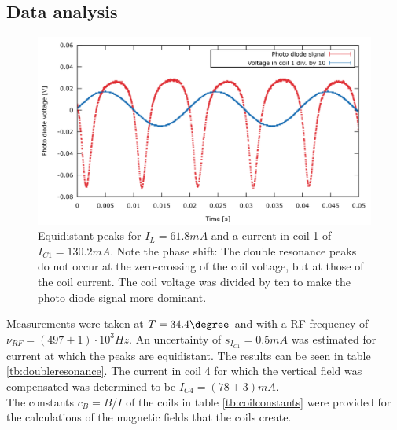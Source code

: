 \subsection{Data analysis}
\begin{figure}
\centering
\includegraphics[width=1.0\linewidth]{graphics/equaldistance}
\caption[Double resonance peaks]{Equidistant peaks for $I_L=\unit{61.8}{mA}$ and a current in coil 1 of $I_{C1}=\unit{130.2}{mA}$. Note the phase shift: The double resonance peaks do not occur at the zero-crossing of the coil voltage, but at those of the coil current. The coil voltage was divided by ten to make the photo diode signal more dominant.}
\label{fig:equaldistance}
\end{figure}
Measurements were taken at $T=\unit{34.4}{\degree}$ and with a RF frequency of $\nu_{RF}=\unit{(497\pm1)\cdot10^3}{Hz}$. An uncertainty of $s_{I_{C1}}=\unit{0.5}{mA}$ was estimated for current at which the peaks are equidistant. The results can be seen in table \ref{tb:doubleresonance}. The current in coil 4 for which the vertical field was compensated was determined to be $I_{C4}=\unit{(78\pm3)}{mA}$.\\
The constants $c_B=B/I$ of the coils in table \ref{tb:coilconstants} were provided for the calculations of the magnetic fields that the coils create.


